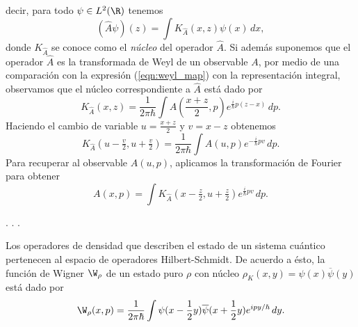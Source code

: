 decir, para todo $\psi \in L^2(\R)$ tenemos
\begin{equation}
  \left( \hat{A}\psi \right)(z)
  = \int K_{\hat{A}}(x,z) \psi(x) \, dx,
\end{equation}
donde $K_{\hat{A}}$ se conoce como el \textit{núcleo} del
operador $\hat{A}$. Si además suponemos que el operador
$\hat{A}$ es la transformada de Weyl de un observable $A$,
por medio de una comparación con la expresión
(\ref{eqn:weyl_map}) con la representación integral,
observamos que el núcleo correspondiente a $\hat{A}$ está
dado por
\begin{equation}
  K_{\hat{A}}(x,z)
  = \frac{1}{2\pi\hbar} \int A\left( \frac{x+z}{2}, p
  \right) e^{\frac{i}{\hbar} p (z-x)} \, dp.
\end{equation}
Haciendo el cambio de variable $u = \frac{x+z}{2}$ y $v =
x - z$ obtenemos
\begin{equation}
  K_{\hat{A}}(u - \tfrac{v}{2}, u + \tfrac{v}{2})
  = \frac{1}{2\pi\hbar} \int A\left( u, p \right)
  e^{-\frac{i}{\hbar} p v} \, dp.
\end{equation}
Para recuperar al observable $A(u,p)$, aplicamos la
transformación de Fourier para obtener
\begin{equation}
  A(x,p)
  = \int K_{\hat{A}}(x-\tfrac{z}{2}, u + \tfrac{z}{2})
  e^{\frac{i}{\hbar} p v} \, dp.
\end{equation}

. . . 

Los operadores de densidad que describen el estado de un
sistema cuántico pertenecen al espacio de operadores
Hilbert-Schmidt. De acuerdo a ésto, la función de Wigner
$\W_\rho$ de un estado puro $\rho$ con núcleo
$\rho_K(x,y) = \psi(x)\overline{\psi}(y)$ está dado por
\[
  \W_\rho(x,p)
  = \frac{1}{2\pi\hbar} \int \psi(x - \frac{1}{2}y)
  \overline{\psi}(x + \frac{1}{2}y) e^{ipy / \hbar} \,
  dy.
\] 
